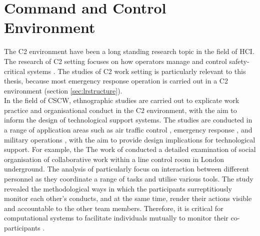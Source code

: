 

\section{Command and Control Environment}\label{sec:LRC2}
The \acf{C2} environment have been a long standing research topic in the field of \acf{HCI}. The  research of \ac{C2} setting focuses on how operators manage and control safety-critical systems \cite{Fischer2015}. The studies of \ac{C2} work setting is particularly relevant to this thesis, because most emergency response operation is carried out in a \ac{C2} environment (section \ref{sec:lrstructure}). \\

In the field of \ac{CSCW}, ethnographic studies are carried out to explicate work practice and organisational conduct in the \ac{C2} environment, with the aim to inform the design of technological support systems. The studies are conducted in a range of application areas such as air traffic control \cite{RichardH.R.HarperJohnA.Hughes1989}, emergency response \cite{Fischer2015} , and military operations \cite{Tolcher2005}, with the aim to provide design implications for technological support. For example, the The work of \cite{Heath1992} conducted a detailed examination of social organisation of collaborative work within a line control room in London underground. The analysis of \cite{Heath1992} particularly focus on interaction between different personnel as they coordinate a range of tasks and utilise various tools. The study revealed the methodological ways in which the participants surreptitiously monitor each other's conducts, and at the same time, render their actions visible and accountable to the other team members. Therefore, it is critical for computational systems to facilitate individuals mutually to monitor their co-participants \cite{Heath1992}.\\

